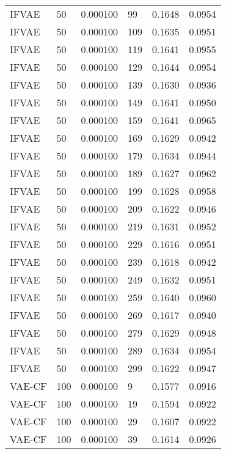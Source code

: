\begin{tabular}{llrlrr}
   IFVAE &   50 &  0.000100 &    99 &  0.1648 &       0.0954 \\
   IFVAE &   50 &  0.000100 &   109 &  0.1635 &       0.0951 \\
   IFVAE &   50 &  0.000100 &   119 &  0.1641 &       0.0955 \\
   IFVAE &   50 &  0.000100 &   129 &  0.1644 &       0.0954 \\
   IFVAE &   50 &  0.000100 &   139 &  0.1630 &       0.0936 \\
   IFVAE &   50 &  0.000100 &   149 &  0.1641 &       0.0950 \\
   IFVAE &   50 &  0.000100 &   159 &  0.1641 &       0.0965 \\
   IFVAE &   50 &  0.000100 &   169 &  0.1629 &       0.0942 \\
   IFVAE &   50 &  0.000100 &   179 &  0.1634 &       0.0944 \\
   IFVAE &   50 &  0.000100 &   189 &  0.1627 &       0.0962 \\
   IFVAE &   50 &  0.000100 &   199 &  0.1628 &       0.0958 \\
   IFVAE &   50 &  0.000100 &   209 &  0.1622 &       0.0946 \\
   IFVAE &   50 &  0.000100 &   219 &  0.1631 &       0.0952 \\
   IFVAE &   50 &  0.000100 &   229 &  0.1616 &       0.0951 \\
   IFVAE &   50 &  0.000100 &   239 &  0.1618 &       0.0942 \\
   IFVAE &   50 &  0.000100 &   249 &  0.1632 &       0.0951 \\
   IFVAE &   50 &  0.000100 &   259 &  0.1640 &       0.0960 \\
   IFVAE &   50 &  0.000100 &   269 &  0.1617 &       0.0940 \\
   IFVAE &   50 &  0.000100 &   279 &  0.1629 &       0.0948 \\
   IFVAE &   50 &  0.000100 &   289 &  0.1634 &       0.0954 \\
   IFVAE &   50 &  0.000100 &   299 &  0.1622 &       0.0947 \\
  VAE-CF &  100 &  0.000100 &     9 &  0.1577 &       0.0916 \\
  VAE-CF &  100 &  0.000100 &    19 &  0.1594 &       0.0922 \\
  VAE-CF &  100 &  0.000100 &    29 &  0.1607 &       0.0922 \\
  VAE-CF &  100 &  0.000100 &    39 &  0.1614 &       0.0926 \\

\end{tabular}
